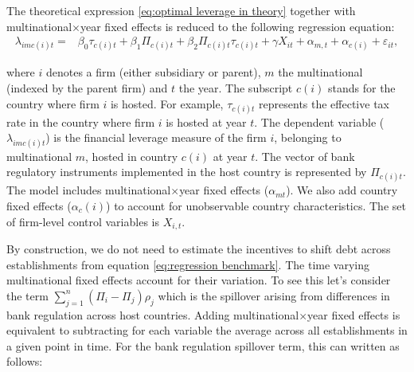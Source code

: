 \documentclass[12pt]{article}
\begin{document}
    The theoretical expression \ref{eq:optimal leverage in theory} together with multinational$\times$year fixed effects is reduced to the following regression equation:  
    \begin{equation}
    \begin{aligned}
    \lambda_{imc(i)t}=&\beta_0\tau_{c(i)t}+\beta_1\Pi_{c(i)t}+\beta_2\Pi_{c(i)t}\tau_{c(i)t}+\gamma X_{it}+\alpha_{m,t}+\alpha_{c(i)}+\varepsilon_{it},
    \label{eq:regression benchmark}
    \end{aligned}
    \end{equation}
    
    where $i$ denotes a firm (either subsidiary or parent), $m$ the multinational (indexed by the parent firm) and $t$ the year. The subscript $c(i)$ stands for the country where firm $i$ is hosted. For example, $\tau_{c(i)t}$ represents the effective tax rate in the country where firm $i$ is hosted at year $t$. The dependent variable ($\lambda_{imc(i)t}$) is the financial leverage measure of the firm $i$, belonging to multinational $m$, hosted in country $c(i)$ at year $t$. The vector of bank regulatory instruments implemented in the host country is represented by $\Pi_{c(i)t}$. The model includes multinational$\times$year fixed effects ($\alpha_{mt}$). We also add country fixed effects ($\alpha_c(i)$) to account for unobservable country characteristics. The set of firm-level control variables is $X_{i,t}$. 
    
    By construction, we do not need to estimate the incentives to shift debt across establishments from equation \ref{eq:regression benchmark}. The time varying multinational fixed effects account for their variation. To see this let's consider the term $\sum_{j=1}^{n}(\Pi_i-\Pi_j)\rho_j$ which is the spillover arising from differences in bank regulation across host countries. Adding multinational$\times$year fixed effects is equivalent to subtracting for each variable the average across all establishments in a given point in time. For the bank regulation spillover term, this can written as follows:
    
\end{document}
